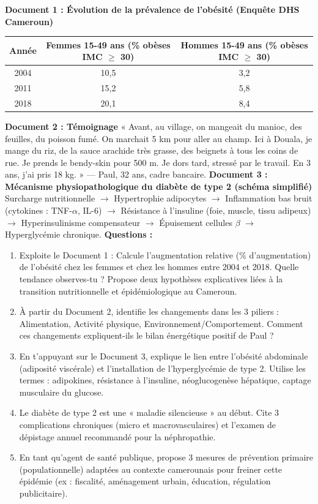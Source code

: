 \documentclass[11pt]{article}
\begin{document}
\begin{exercice}
\textbf{Document 1 : Évolution de la prévalence de l'obésité (Enquête DHS Cameroun)}
\begin{center}
\begin{tabular}{|c|c|c|}\hline
Année & Femmes 15-49 ans (\% obèses IMC $\ge$ 30) & Hommes 15-49 ans (\% obèses IMC $\ge$ 30) \\ \hline
2004 & 10,5 & 3,2 \\
2011 & 15,2 & 5,8 \\
2018 & 20,1 & 8,4 \\ \hline
\end{tabular}
\end{center}
\textbf{Document 2 : Témoignage}
« Avant, au village, on mangeait du manioc, des feuilles, du poisson fumé. On marchait 5 km pour aller au champ. Ici à Douala, je mange du riz, de la sauce arachide très grasse, des beignets à tous les coins de rue. Je prends le bendy-skin pour 500 m. Je dors tard, stressé par le travail. En 3 ans, j'ai pris 18 kg. » — Paul, 32 ans, cadre bancaire.
\textbf{Document 3 : Mécanisme physiopathologique du diabète de type 2 (schéma simplifié)}
Surcharge nutritionnelle $\rightarrow$ Hypertrophie adipocytes $\rightarrow$ Inflammation bas bruit (cytokines : TNF-$\alpha$, IL-6) $\rightarrow$ Résistance à l'insuline (foie, muscle, tissu adipeux) $\rightarrow$ Hyperinsulinisme compensateur $\rightarrow$ Épuisement cellules $\beta$ $\rightarrow$ Hyperglycémie chronique.
\textbf{Questions :}
\begin{enumerate}
\item Exploite le Document 1 : Calcule l'augmentation relative (\% d'augmentation) de l'obésité chez les femmes et chez les hommes entre 2004 et 2018. Quelle tendance observes-tu ? Propose deux hypothèses explicatives liées à la transition nutritionnelle et épidémiologique au Cameroun.
\item À partir du Document 2, identifie les changements dans les 3 piliers : Alimentation, Activité physique, Environnement/Comportement. Comment ces changements expliquent-ils le bilan énergétique positif de Paul ?
\item En t'appuyant sur le Document 3, explique le lien entre l'obésité abdominale (adiposité viscérale) et l'installation de l'hyperglycémie de type 2. Utilise les termes : adipokines, résistance à l'insuline, néoglucogenèse hépatique, captage musculaire du glucose.
\item Le diabète de type 2 est une « maladie silencieuse » au début. Cite 3 complications chroniques (micro et macrovasculaires) et l'examen de dépistage annuel recommandé pour la néphropathie.
\item En tant qu'agent de santé publique, propose 3 mesures de prévention primaire (populationnelle) adaptées au contexte camerounais pour freiner cette épidémie (ex : fiscalité, aménagement urbain, éducation, régulation publicitaire).
\end{enumerate}
\end{exercice}
\end{document}
